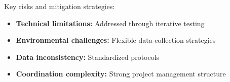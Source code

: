 \noindent
Key risks and mitigation strategies:

\begin{itemize}
    \item \textbf{Technical limitations:} Addressed through iterative testing
    \item \textbf{Environmental challenges:} Flexible data collection strategies
    \item \textbf{Data inconsistency:} Standardized protocols
    \item \textbf{Coordination complexity:} Strong project management structure
\end{itemize}